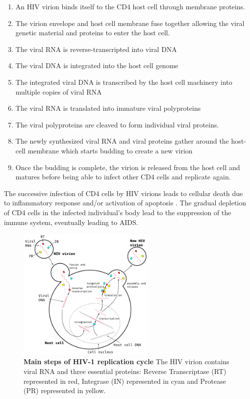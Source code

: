 \documentclass[
  11pt,
  twoside]{scrbook}
\newcommand{\extcaption}[2]{
    \caption[#1]{
        \textbf{#1}\newline
        #2
    }
}
\begin{document}
\begin{enumerate}
\def\labelenumi{\arabic{enumi}.}
\item
  An HIV virion binds itself to the CD4 host cell through membrane proteins.
\item
  The virion envelope and host cell membrane fuse together allowing the viral genetic material and proteins to enter the host cell.
\item
  The viral RNA is reverse-transcripted into viral DNA
\item
  The viral DNA is integrated into the host cell genome
\item
  The integrated viral DNA is transcribed by the host cell machinery into multiple copies of viral RNA
\item
  The viral RNA is translated into immature viral polyproteins
\item
  The viral polyproteins are cleaved to form individual viral proteins.
\item
  The newly synthesized viral RNA and viral proteins gather around the host-cell membrane which starts budding to create a new virion
\item
  Once the budding is complete, the virion is released from the host cell and matures before being able to infect other CD4 cells and replicate again.
\end{enumerate}

The successive infection of CD4 cells by HIV virions leads to cellular death due to inflammatory response and/or activation of apoptosis \autocite{gougeonDirectIndirectMechanisms1993,vidyavijayanPathophysiologyCD4TCell2017}. The gradual depletion of CD4 cells in the infected individual's body lead to the suppression of the immune system, eventually leading to AIDS.

\begin{figure}
\centering
\includegraphics[width=0.6\textwidth]{./figures/HIV-Intro/HIV-cycle.pdf}
\extcaption{Main steps of HIV-1 replication cycle}{The HIV virion contains viral RNA and three essential proteins: Reverse Transcriptase (RT) represented in red, Integrase (IN) represented in cyan and Protease (PR) represented in yellow.}
\label{fig:hivCycle}
\end{figure}
\end{document}
